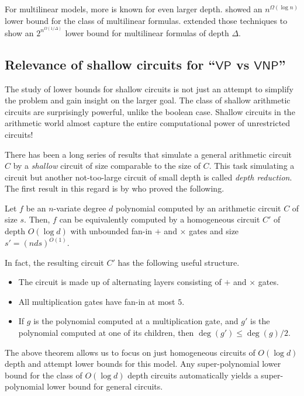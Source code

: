 \documentclass[12pt]{report}
\newcommand{\VP}{\mathsf{VP}}
\newcommand{\VNP}{\mathsf{VNP}}
\begin{document}
For multilinear models, more is known for even larger depth. \cite{raz2004} showed an $n^{\Omega(\log n)}$ lower bound for the class of multilinear formulas. \cite{raz-yehudayoff} extended those techniques to show an $2^{n^{\Omega(1/\Delta)}}$ lower bound for multilinear formulas of depth $\Delta$. 

\subsection{Relevance of shallow circuits for ``$\VP$ vs $\VNP$''}

The study of lower bounds for shallow circuits is not just an attempt to simplify the problem and gain insight on the larger goal. The class of shallow arithmetic circuits are surprisingly powerful, unlike the boolean case. Shallow circuits in the arithmetic world almost capture the entire computational power of unrestricted circuits! 

There has been a long series of results that simulate a general arithmetic circuit $C$ by a \emph{shallow} circuit of size comparable to the size of $C$. This task simulating a circuit but another not-too-large circuit of small depth is called \emph{depth reduction}. The first result in this regard is by \cite{vsbr83} who proved the following. 

\begin{theorem} \label{thm:vsbr}
Let $f$ be an $n$-variate degree $d$ polynomial computed by an arithmetic circuit $C$ of size $s$. Then, $f$ can be equivalently computed by a homogeneous circuit $C'$ of depth $O(\log d)$ with unbounded fan-in $+$ and $\times$ gates and size $s' = (nds)^{O(1)}$. 
\end{theorem}

In fact, the resulting circuit $C'$ has the following useful structure. 

\begin{itemize}
\item The circuit is made up of alternating layers consisting of $+$ and $\times$  gates. 
\item All multiplication gates have fan-in at most $5$.
\item If $g$ is the polynomial computed at a multiplication gate, and $g'$ is the polynomial computed at one of its children, then $\deg(g') \leq \deg(g)/2$. 
\end{itemize}

The above theorem allows us to focus on just homogeneous circuits of $O(\log d)$ depth and attempt lower bounds for this model. Any super-polynomial lower bound for the class of $O(\log d)$ depth circuits automatically yields a super-polynomial lower bound for general circuits. \\
\end{document}

